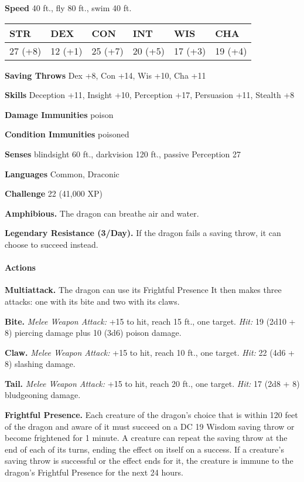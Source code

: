 \documentclass[
]{article}
\begin{document}
\textbf{Speed} 40 ft., fly 80 ft., swim 40 ft.

\begin{longtable}[]{@{}llllll@{}}
\toprule
STR & DEX & CON & INT & WIS & CHA\tabularnewline
\midrule
\endhead
27 (+8) & 12 (+1) & 25 (+7) & 20 (+5) & 17 (+3) & 19 (+4)\tabularnewline
\bottomrule
\end{longtable}

\textbf{Saving Throws} Dex +8, Con +14, Wis +10, Cha +11

\textbf{Skills} Deception +11, Insight +10, Perception +17, Persuasion
+11, Stealth +8

\textbf{Damage Immunities} poison

\textbf{Condition Immunities} poisoned

\textbf{Senses} blindsight 60 ft., darkvision 120 ft., passive
Perception 27

\textbf{Languages} Common, Draconic

\textbf{Challenge} 22 (41,000 XP)

\textbf{Amphibious.} The dragon can breathe air and water.

\textbf{Legendary Resistance (3/Day).} If the dragon fails a saving
throw, it can choose to succeed instead.

\hypertarget{actions-31}{%
\paragraph{Actions}\label{actions-31}}

\textbf{Multiattack.} The dragon can use its Frightful Presence It then
makes three attacks: one with its bite and two with its claws.

\textbf{Bite.} \emph{Melee Weapon Attack:} +15 to hit, reach 15 ft., one
target. \emph{Hit:} 19 (2d10 + 8) piercing damage plus 10 (3d6) poison
damage.

\textbf{Claw.} \emph{Melee Weapon Attack:} +15 to hit, reach 10 ft., one
target. \emph{Hit:} 22 (4d6 + 8) slashing damage.

\textbf{Tail.} \emph{Melee Weapon Attack:} +15 to hit, reach 20 ft., one
target. \emph{Hit:} 17 (2d8 + 8) bludgeoning damage.

\textbf{Frightful Presence.} Each creature of the dragon's choice that
is within 120 feet of the dragon and aware of it must succeed on a DC 19
Wisdom saving throw or become frightened for 1 minute. A creature can
repeat the saving throw at the end of each of its turns, ending the
effect on itself on a success. If a creature's saving throw is
successful or the effect ends for it, the creature is immune to the
dragon's Frightful Presence for the next 24 hours.
\end{document}
